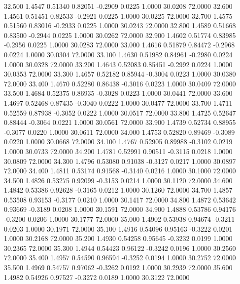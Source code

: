   32.500   1.4547   0.51340   0.82051  -0.2909   0.0225   1.0000  30.0208  72.0000
  32.600   1.4561   0.51451   0.82533  -0.2921   0.0225   1.0000  30.0225  72.0000
  32.700   1.4575   0.51560   0.83016  -0.2933   0.0225   1.0000  30.0243  72.0000
  32.800   1.4589   0.51668   0.83500  -0.2944   0.0225   1.0000  30.0262  72.0000
  32.900   1.4602   0.51774   0.83985  -0.2956   0.0225   1.0000  30.0283  72.0000
  33.000   1.4616   0.51879   0.84472  -0.2968   0.0224   1.0000  30.0304  72.0000
  33.100   1.4630   0.51982   0.84961  -0.2980   0.0224   1.0000  30.0328  72.0000
  33.200   1.4643   0.52083   0.85451  -0.2992   0.0224   1.0000  30.0353  72.0000
  33.300   1.4657   0.52182   0.85944  -0.3004   0.0223   1.0000  30.0380  72.0000
  33.400   1.4670   0.52280   0.86438  -0.3016   0.0223   1.0000  30.0409  72.0000
  33.500   1.4684   0.52375   0.86935  -0.3028   0.0223   1.0000  30.0441  72.0000
  33.600   1.4697   0.52468   0.87435  -0.3040   0.0222   1.0000  30.0477  72.0000
  33.700   1.4711   0.52559   0.87938  -0.3052   0.0222   1.0000  30.0517  72.0000
  33.800   1.4725   0.52647   0.88444  -0.3064   0.0221   1.0000  30.0561  72.0000
  33.900   1.4739   0.52734   0.88955  -0.3077   0.0220   1.0000  30.0611  72.0000
  34.000   1.4753   0.52820   0.89469  -0.3089   0.0220   1.0000  30.0668  72.0000
  34.100   1.4767   0.52905   0.89988  -0.3102   0.0219   1.0000  30.0733  72.0000
  34.200   1.4781   0.52991   0.90511  -0.3115   0.0218   1.0000  30.0809  72.0000
  34.300   1.4796   0.53080   0.91038  -0.3127   0.0217   1.0000  30.0897  72.0000
  34.400   1.4811   0.53174   0.91568  -0.3140   0.0216   1.0000  30.1000  72.0000
  34.500   1.4826   0.53275   0.92099  -0.3153   0.0214   1.0000  30.1120  72.0000
  34.600   1.4842   0.53386   0.92628  -0.3165   0.0212   1.0000  30.1260  72.0000
  34.700   1.4857   0.53508   0.93153  -0.3177   0.0210   1.0000  30.1417  72.0000
  34.800   1.4872   0.53642   0.93669  -0.3189   0.0208   1.0000  30.1591  72.0000
  34.900   1.4888   0.53786   0.94176  -0.3200   0.0206   1.0000  30.1777  72.0000
  35.000   1.4902   0.53938   0.94674  -0.3211   0.0203   1.0000  30.1971  72.0000
  35.100   1.4916   0.54096   0.95163  -0.3222   0.0201   1.0000  30.2168  72.0000
  35.200   1.4930   0.54258   0.95645  -0.3232   0.0199   1.0000  30.2365  72.0000
  35.300   1.4944   0.54423   0.96122  -0.3242   0.0196   1.0000  30.2560  72.0000
  35.400   1.4957   0.54590   0.96594  -0.3252   0.0194   1.0000  30.2752  72.0000
  35.500   1.4969   0.54757   0.97062  -0.3262   0.0192   1.0000  30.2939  72.0000
  35.600   1.4982   0.54926   0.97527  -0.3272   0.0189   1.0000  30.3122  72.0000
